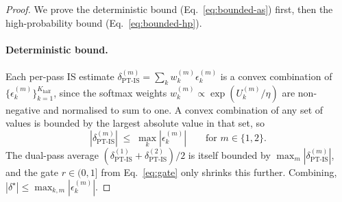 \documentclass{article}
\begin{document}
\begin{proof}
We prove the deterministic bound (Eq.~\ref{eq:bounded-as}) first, then the high-probability bound (Eq.~\ref{eq:bounded-hp}).

\paragraph{Deterministic bound.}
Each per-pass IS estimate $\delta_{\text{PT-IS}}^{(m)} = \sum_k w_k^{(m)} \epsilon_k^{(m)}$ is a convex combination of $\{\epsilon_k^{(m)}\}_{k=1}^{K_{\text{half}}}$, since the softmax weights $w_k^{(m)} \propto \exp(U_k^{(m)}/\eta)$ are non-negative and normalised to sum to one. A convex combination of any set of values is bounded by the largest absolute value in that set, so
\begin{equation*}
|\delta_{\text{PT-IS}}^{(m)}| \;\leq\; \max_{k} |\epsilon_k^{(m)}| \qquad \text{for } m \in \{1,2\}.
\end{equation*}
The dual-pass average $(\delta_{\text{PT-IS}}^{(1)} + \delta_{\text{PT-IS}}^{(2)})/2$ is itself bounded by $\max_m |\delta_{\text{PT-IS}}^{(m)}|$, and the gate $r \in (0,1]$ from Eq.~\ref{eq:gate} only shrinks this further. Combining, $|\delta^\star| \leq \max_{k,m}|\epsilon_k^{(m)}|$.


\end{proof}
\end{document}
